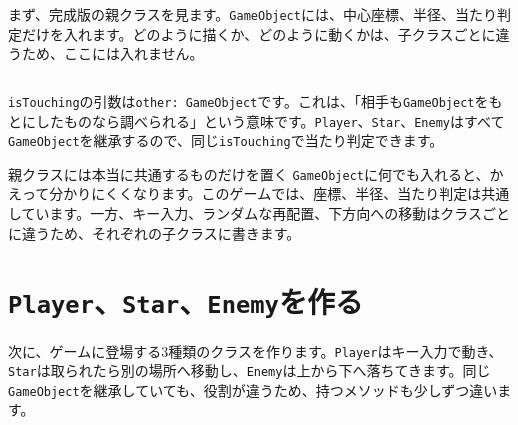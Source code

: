 まず、完成版の親クラスを見ます。\texttt{GameObject}には、中心座標、半径、当たり判定だけを入れます。どのように描くか、どのように動くかは、子クラスごとに違うため、ここには入れません。

\begin{listing}[htbp]
\inputminted[firstline=1,lastline=25]{ts}{typescript-p5/listings/chapter15/star-catcher-game.ts}
\caption{ゲーム内のものに共通する\texttt{GameObject}（\texttt{chapter15/star-catcher-game.ts}）}
\label{lst:chapter15-game-object}
\end{listing}

\texttt{isTouching}の引数は\texttt{other: GameObject}です。これは、「相手も\texttt{GameObject}をもとにしたものなら調べられる」という意味です。\texttt{Player}、\texttt{Star}、\texttt{Enemy}はすべて\texttt{GameObject}を継承するので、同じ\texttt{isTouching}で当たり判定できます。

\begin{notebox}{親クラスには本当に共通するものだけを置く}
\texttt{GameObject}に何でも入れると、かえって分かりにくくなります。このゲームでは、座標、半径、当たり判定は共通しています。一方、キー入力、ランダムな再配置、下方向への移動はクラスごとに違うため、それぞれの子クラスに書きます。
\end{notebox}

\section{\texttt{Player}、\texttt{Star}、\texttt{Enemy}を作る}

次に、ゲームに登場する3種類のクラスを作ります。\texttt{Player}はキー入力で動き、\texttt{Star}は取られたら別の場所へ移動し、\texttt{Enemy}は上から下へ落ちてきます。同じ\texttt{GameObject}を継承していても、役割が違うため、持つメソッドも少しずつ違います。

\begin{listing}[htbp]
\inputminted[firstline=27,lastline=67]{ts}{typescript-p5/listings/chapter15/star-catcher-game.ts}
\caption{キー入力で動く\texttt{Player}（\texttt{chapter15/star-catcher-game.ts}）}
\label{lst:chapter15-player-class}
\end{listing}

\begin{listing}[htbp]
\inputminted[firstline=69,lastline=85]{ts}{typescript-p5/listings/chapter15/star-catcher-game.ts}
\caption{集める対象になる\texttt{Star}（\texttt{chapter15/star-catcher-game.ts}）}
\label{lst:chapter15-star-class}
\end{listing}

